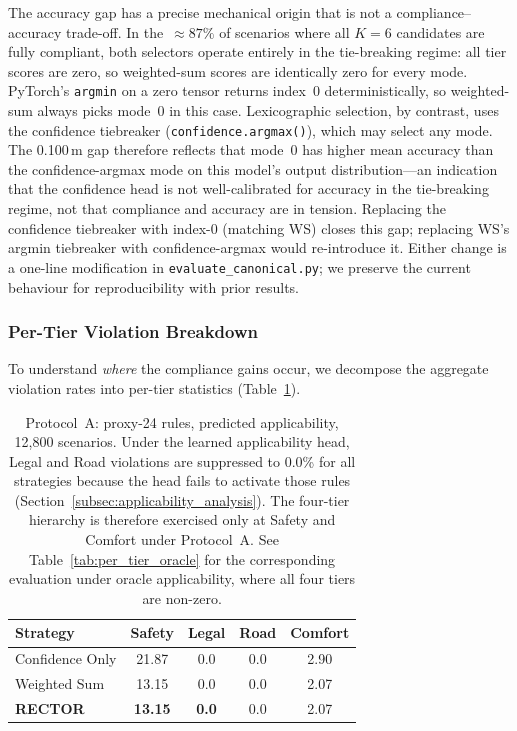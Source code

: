 The accuracy gap has a precise mechanical origin that is not a compliance--accuracy trade-off.  In the~$\approx\!87\%$ of scenarios where all $K{=}6$ candidates are fully compliant, both selectors operate entirely in the tie-breaking regime: all tier scores are zero, so weighted-sum scores are identically zero for every mode.  PyTorch's \texttt{argmin} on a zero tensor returns index~0 deterministically, so weighted-sum always picks mode~0 in this case.  Lexicographic selection, by contrast, uses the confidence tiebreaker (\texttt{confidence.argmax()}), which may select any mode.  The 0.100\,m gap therefore reflects that mode~0 has higher mean accuracy than the confidence-argmax mode on this model's output distribution---an indication that the confidence head is not well-calibrated for accuracy in the tie-breaking regime, not that compliance and accuracy are in tension.  Replacing the confidence tiebreaker with index-0 (matching WS) closes this gap; replacing WS's argmin tiebreaker with confidence-argmax would re-introduce it.  Either change is a one-line modification in \texttt{evaluate\_canonical.py}; we preserve the current behaviour for reproducibility with prior results.

\subsubsection{Per-Tier Violation Breakdown}
\label{subsubsec:per_tier_breakdown}

To understand \emph{where} the compliance gains occur, we decompose the aggregate violation rates into per-tier statistics (Table~\ref{tab:per_tier_breakdown}).

\begin{table}[t]
\centering
\caption{Per-Tier Violation Rates by Selection Strategy (\%, Protocol~A, Predicted Applicability)}
\label{tab:per_tier_breakdown}
\begin{tabular}{lcccc}
\toprule
\textbf{Strategy} & \textbf{Safety} & \textbf{Legal} & \textbf{Road} & \textbf{Comfort} \\
\midrule
Confidence Only & 21.87 & 0.0 & 0.0 & 2.90 \\
Weighted Sum & 13.15 & 0.0 & 0.0 & 2.07 \\
\textbf{RECTOR} & \textbf{13.15} & \textbf{0.0} & 0.0 & 2.07 \\
\bottomrule
\end{tabular}
\vspace{1mm}
\caption*{\footnotesize Protocol~A: proxy-24 rules, predicted applicability, 12{,}800 scenarios.  Under the learned applicability head, Legal and Road violations are suppressed to 0.0\% for all strategies because the head fails to activate those rules (Section~\ref{subsec:applicability_analysis}).  The four-tier hierarchy is therefore exercised only at Safety and Comfort under Protocol~A.  See Table~\ref{tab:per_tier_oracle} for the corresponding evaluation under oracle applicability, where all four tiers are non-zero.}
\end{table}

